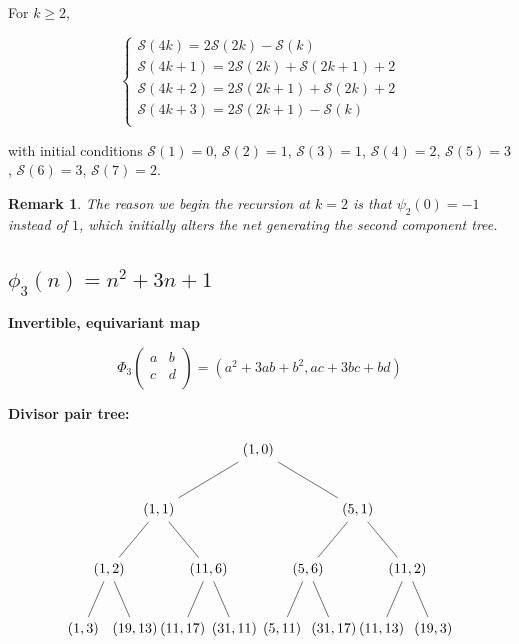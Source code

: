 \documentclass{article}
\newtheorem{remark}[theorem]{Remark}  %
\begin{document}
\

For $k \geq 2$,

$$
\begin{cases}
\mathcal{S}(4k) = 2\mathcal{S}(2k) - \mathcal{S}(k) \\
\mathcal{S}(4k+1) = 2\mathcal{S}(2k) + \mathcal{S}(2k+1) + 2 \\
\mathcal{S}(4k+2) =  2\mathcal{S}(2k+1) + \mathcal{S}(2k) + 2 \\
\mathcal{S}(4k+3) =  2\mathcal{S}(2k+1) - \mathcal{S}(k)  \\
\end{cases}
$$

with initial conditions $\mathcal{S}(1) = 0$, $\mathcal{S}(2) = 1$, $\mathcal{S}(3) = 1$, $\mathcal{S}(4) = 2$, $\mathcal{S}(5) = 3$, $\mathcal{S}(6) = 3$, $\mathcal{S}(7) = 2$.

\begin{remark}
The reason we begin the recursion at $k=2$ is that $\psi_2(0) = -1$ instead of $1$, which initially alters the net generating the second component tree.
\end{remark}


\subsection{$\phi_3(n) = n^2 + 3n + 1$}

\textbf{Invertible, equivariant map}

$$\Phi_3 \begin{pmatrix}
    a & b \\
    c & d \\
\end{pmatrix} = (a^2 + 3ab + b^2, ac + 3bc + bd)$$

\textbf{Divisor pair tree:}

$$
\begin{tikzpicture}[level distance=15mm, 
                    level 1/.style={sibling distance=50mm},
                    level 2/.style={sibling distance=25mm},
                    level 3/.style={sibling distance=13mm}]
  \node {\((1, 0)\)}
    child {
      node {\((1, 1)\)} 
      child {
        node {\((1, 2)\)}
        child {node {\((1, 3)\)}}
        child {node {\((19, 13)\)}}
      }
      child {
        node {\((11, 6)\)}
        child {node {\((11, 17)\)}}
        child {node {\((31, 11)\)}}
      }
    }
    child {
      node {\((5, 1)\)}
      child {
        node {\((5, 6)\)}
        child {node {\((5, 11)\)}}
        child {node {\((31, 17)\)}}
      }
      child {
        node {\((11, 2)\)}
        child {node {\((11, 13)\)}}
        child {node {\((19, 3)\)}}
      } 
    };
\end{tikzpicture}
$$
\end{document}
